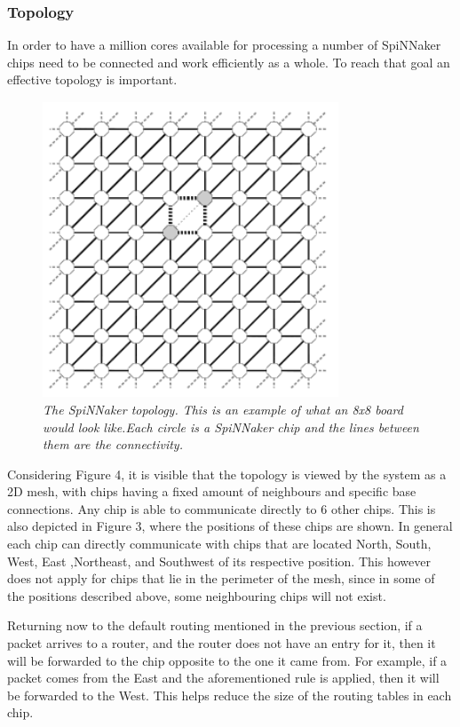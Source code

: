 \documentclass[12pt,twosided]{article}
\begin{document}
\subsubsection{Topology}
In order to have a million cores available for processing a number of SpiNNaker chips need to be connected and work efficiently as a whole. To reach that goal an effective topology is important.
\begin{figure}[h!]
\includegraphics[width=250pt,height=250pt,scale=2]{Pics/topology.png}
\centering
\caption{
\emph{The SpiNNaker topology\cite{navaridas2009understanding}. This is an example of what an 8x8 board would look like.Each circle is a SpiNNaker chip and the lines between them are the connectivity.}}
\end{figure}

Considering Figure 4, it is visible that the topology is viewed by the system as a 2D mesh, with chips having a fixed amount of neighbours and specific base connections. Any chip is able to communicate directly to 6 other chips. This is also depicted in Figure 3, where the positions of these chips are shown. In general each chip can directly communicate with chips that are located North, South, West, East ,Northeast, and Southwest of its respective position. This however does not apply for chips that lie in the perimeter of the mesh, since in some of the positions described above, some neighbouring chips will not exist\cite{furber2012overview}. 

Returning now to the default routing mentioned in the previous section, if a packet arrives to a router, and the router does not have an entry for it, then it will be forwarded to the chip opposite to the one it came from. For example, if a packet comes from the East and the aforementioned rule is applied, then it will be forwarded to the West. This helps reduce the size of the routing tables in each chip\cite{khan2008spinnaker}.
\end{document}

